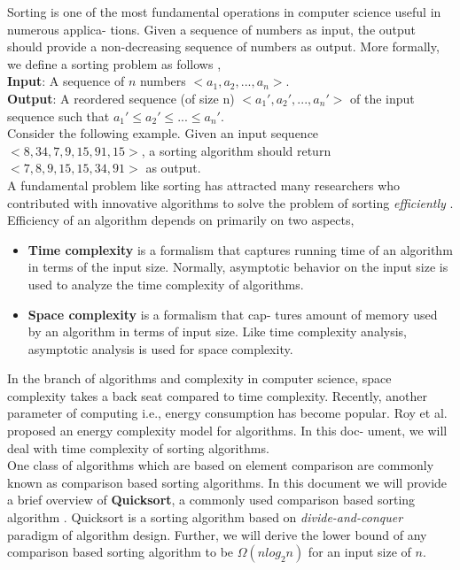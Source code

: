 Sorting is one of the most fundamental operations in computer science useful in numerous applica- tions. Given a sequence of numbers as input, the output should provide a non-decreasing sequence of numbers as output. More formally, we define a sorting problem as follows \cite{cormen},\\
\textbf{Input}: A sequence of $n$ numbers $<a_1, a_2, ..., a_n>$.\\
\textbf{Output}: A reordered sequence (of size n) $<a_1', a_2', ..., a_n'>$ of the input sequence such that $a_1' \leq a_2' \leq...\leq a_n'$.\\
Consider the following example. Given an input sequence $<8, 34, 7, 9, 15, 91, 15>$, a sorting algorithm should return $<7, 8, 9, 15, 15, 34, 91>$ as output.\\
\indent A fundamental problem like sorting has attracted many researchers who contributed with innovative algorithms to solve the problem of sorting \textit{efficiently} \cite{martin}. Efficiency of an algorithm depends on primarily on two aspects,\\
\begin{itemize}
    \item \textbf{Time complexity} is a formalism that captures running time of an algorithm in terms of the input size. Normally, asymptotic behavior on the input size is used to analyze the time complexity of algorithms.
    \item \textbf{Space complexity} is a formalism that cap- tures amount of memory used by an algorithm in terms of input size. Like time complexity analysis, asymptotic analysis is used for space complexity.
\end{itemize}
In the branch of algorithms and complexity in computer science, space complexity takes a back seat compared to time complexity. Recently, another parameter of computing i.e., energy consumption has become popular. Roy et al. \cite{roy} proposed an energy complexity model for algorithms. In this doc- ument, we will deal with time complexity of sorting algorithms.\\
\indent One class of algorithms which are based on element comparison are commonly known as comparison based sorting algorithms. In this document we will provide a brief overview of \textbf{Quicksort}, a commonly used comparison based sorting algorithm \cite{hoare}. Quicksort is a sorting algorithm based on \textit{divide-and-conquer} paradigm of algorithm design. Further, we will derive the lower bound of any comparison based sorting algorithm to be $\Omega(n log_2 n)$ for an input size of $n$.